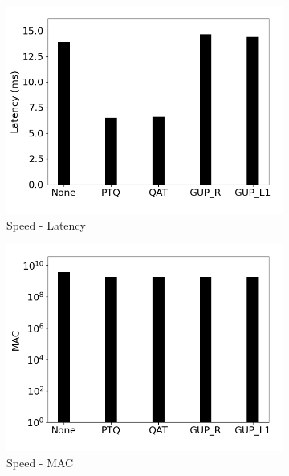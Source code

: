 \begin{figure}[]
\begin{subfigure}{0.19\textwidth}
        \includegraphics[width=1\textwidth]{other/figures/Resnet18_ImageNet1k_PC/Latency.png}
        \caption{Speed - Latency}
    \end{subfigure}
    \begin{subfigure}{0.19\textwidth}
        \includegraphics[width=1\textwidth]{other/figures/Resnet18_ImageNet1k_PC/MAC.png}
        \caption{Speed - MAC}
    \end{subfigure}
    \begin{subfigure}{0.19\textwidth}

\end{subfigure}
\end{figure}
